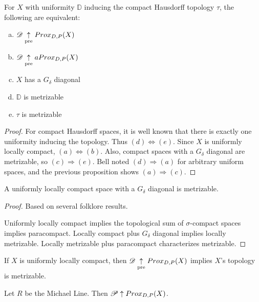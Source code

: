 \begin{corollary}
  For $X$ with uniformity $\mathbb{D}$ inducing the compact Hausdorff topology 
  $\tau$, the following are equivalent:
    \begin{enumerate}[(a)]
      \item $\mathscr{D} \underset{\text{pre}}{\uparrow} Prox_{D,P}(X)$
      \item $\mathscr{D} \underset{\text{pre}}{\uparrow} aProx_{D,P}(X)$
      \item $X$ has a $G_\delta$ diagonal
      \item $\mathbb{D}$ is metrizable
      \item $\tau$ is metrizable
    \end{enumerate}
\end{corollary}

\begin{proof}
  For compact Hausdorff spaces, it is well known that there is exactly one
  uniformity inducing the topology. Thus $(d)\Leftrightarrow(e)$. Since $X$
  is uniformly locally compact, $(a)\Leftrightarrow(b)$. Also, compact spaces
  with a $G_\delta$ diagonal are metrizable, so $(c)\Rightarrow(e)$. 
  Bell noted $(d)\Rightarrow(a)$ 
  for arbitrary uniform spaces, and the previous proposition shows
  $(a)\Rightarrow(c)$.
\end{proof}

\begin{theorem}
  A uniformly locally compact space with a $G_\delta$ diagonal is metrizable.
\end{theorem}

\begin{proof}
  Based on several folklore results.

  Uniformly locally compact implies the topological sum of $\sigma$-compact
  spaces implies paracompact. Locally compact plus $G_\delta$ diagonal implies
  locally metrizable. Locally metrizable plus paracompact characterizes
  metrizable.
\end{proof}

\begin{corollary}
  If $X$ is uniformly locally compact, then $\mathscr{D} \underset{\text{pre}}{\uparrow} Prox_{D,P}(X)$ 
  implies $X$'s topology is metrizable.
\end{corollary}





\newpage

\begin{example}
  Let $R$ be the Michael Line. Then $\mathscr{P}\uparrow Prox_{D,P}(X)$.
\end{example}

